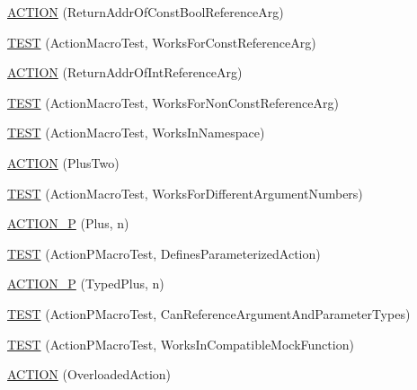 \begin{DoxyCompactItemize}
\mbox{\hyperlink{namespacetesting_1_1gmock__generated__actions__test_a78725817afcd5d7f19df2bdc2d41b9db}{A\+C\+T\+I\+ON}} (Return\+Addr\+Of\+Const\+Bool\+Reference\+Arg)
\item 
\mbox{\hyperlink{namespacetesting_1_1gmock__generated__actions__test_a8b4dadfc32c71e754d6ba3daae382715}{T\+E\+ST}} (Action\+Macro\+Test, Works\+For\+Const\+Reference\+Arg)
\item 
\mbox{\hyperlink{namespacetesting_1_1gmock__generated__actions__test_aeb01205293078272696bd0c19ce4e848}{A\+C\+T\+I\+ON}} (Return\+Addr\+Of\+Int\+Reference\+Arg)
\item 
\mbox{\hyperlink{namespacetesting_1_1gmock__generated__actions__test_a093a824ac7e8ec775a8f5d7b11d223a9}{T\+E\+ST}} (Action\+Macro\+Test, Works\+For\+Non\+Const\+Reference\+Arg)
\item 
\mbox{\hyperlink{namespacetesting_1_1gmock__generated__actions__test_af75a9a5b9d6a1cf718a58f030a5a9133}{T\+E\+ST}} (Action\+Macro\+Test, Works\+In\+Namespace)
\item 
\mbox{\hyperlink{namespacetesting_1_1gmock__generated__actions__test_a0eef2f885ccb1e4fac88a910f0fc5c2e}{A\+C\+T\+I\+ON}} (Plus\+Two)
\item 
\mbox{\hyperlink{namespacetesting_1_1gmock__generated__actions__test_acb98f6208678d9f5500a0c2c095b8cd0}{T\+E\+ST}} (Action\+Macro\+Test, Works\+For\+Different\+Argument\+Numbers)
\item 
\mbox{\hyperlink{namespacetesting_1_1gmock__generated__actions__test_ac081154b3ae2f099bd5be853cacfdaa4}{A\+C\+T\+I\+O\+N\+\_\+P}} (Plus, n)
\item 
\mbox{\hyperlink{namespacetesting_1_1gmock__generated__actions__test_a42a5fe606ca18b2eb1e5d7884045118f}{T\+E\+ST}} (Action\+P\+Macro\+Test, Defines\+Parameterized\+Action)
\item 
\mbox{\hyperlink{namespacetesting_1_1gmock__generated__actions__test_a3bcd440e11ab64ad5eb007efce33cf7d}{A\+C\+T\+I\+O\+N\+\_\+P}} (Typed\+Plus, n)
\item 
\mbox{\hyperlink{namespacetesting_1_1gmock__generated__actions__test_a4262c10efb367abf9771b3060c57d190}{T\+E\+ST}} (Action\+P\+Macro\+Test, Can\+Reference\+Argument\+And\+Parameter\+Types)
\item 
\mbox{\hyperlink{namespacetesting_1_1gmock__generated__actions__test_ab545244777c7559d1b0c2c63ee2be134}{T\+E\+ST}} (Action\+P\+Macro\+Test, Works\+In\+Compatible\+Mock\+Function)
\item 
\mbox{\hyperlink{namespacetesting_1_1gmock__generated__actions__test_a24927d97882dc1d52e203720df804188}{A\+C\+T\+I\+ON}} (Overloaded\+Action)

\end{DoxyCompactItemize}
